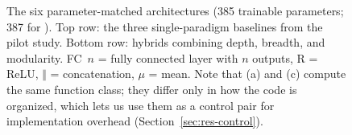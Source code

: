 \begin{figure}[t]
\caption{The six parameter-matched architectures (385 trainable parameters; 387 for \HC). Top row: the three
single-paradigm baselines from the pilot study. Bottom row: hybrids combining depth, breadth, and modularity.
FC~$n$ = fully connected layer with $n$ outputs, R = ReLU, $\Vert$ = concatenation, $\mu$ = mean.
Note that (a) and (c) compute the same function class; they differ only in how the code is organized,
which lets us use them as a control pair for implementation overhead (Section~\ref{sec:res-control}).}
\label{fig:arch}
\end{figure}
